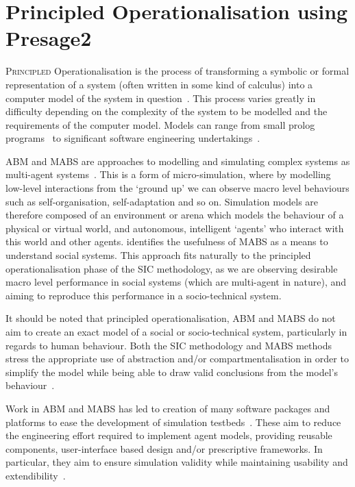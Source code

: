 \acresetall
\chapter{Principled Operationalisation using Presage2}\label{ch:presage}

\lettrine[lines=3]{P}{rincipled} Operationalisation is the process of transforming a symbolic or formal representation of a system (often written in some kind of calculus) into a computer model of the system in question~\citep{Jones2013}. This process varies greatly in difficulty depending on the complexity of the system to be modelled and the requirements of the computer model. Models can range from small prolog programs~\citep{Pitt2005a} to significant software engineering undertakings~\citep{Timm,Oguara2005}.

\ac{ABM} and \ac{MABS} are approaches to modelling and simulating complex systems as multi-agent systems~\citep{Macal2010,Moss2001}.
This is a form of micro-simulation, where by modelling low-level interactions from the `ground up' we can observe macro level behaviours such as self-organisation, self-adaptation and so on.
Simulation models are therefore composed of an environment or arena which models the behaviour of a physical or virtual world, and autonomous, intelligent `agents' who interact with this world and other agents. 
\citet{Axelrod1997} identifies the usefulness of \ac{MABS} as a means to understand social systems. 
This approach fits naturally to the principled operationalisation phase of the \ac{SIC} methodology, as we are observing desirable macro level performance in social systems (which are multi-agent in nature), and aiming to reproduce this performance in a socio-technical system. 

It should be noted that principled operationalisation, \ac{ABM} and \ac{MABS} do not aim to create an exact model of a social or socio-technical system, particularly in regards to human behaviour. Both the \ac{SIC} methodology and \ac{MABS} methods stress the appropriate use of abstraction and/or compartmentalisation in order to simplify the model while being able to draw valid conclusions from the model's behaviour~\citep{Edmonds2001}.

Work in \ac{ABM} and \ac{MABS} has led to creation of many software packages and platforms to ease the development of simulation testbeds~\citep{CynthiaNikolaiandGregoryMadey2009}. These aim to reduce the engineering effort required to implement agent models, providing reusable components, user-interface based design and/or prescriptive frameworks. In particular, they aim to ensure simulation validity while maintaining usability and extendibility~\citep{Axelrod1997}.

